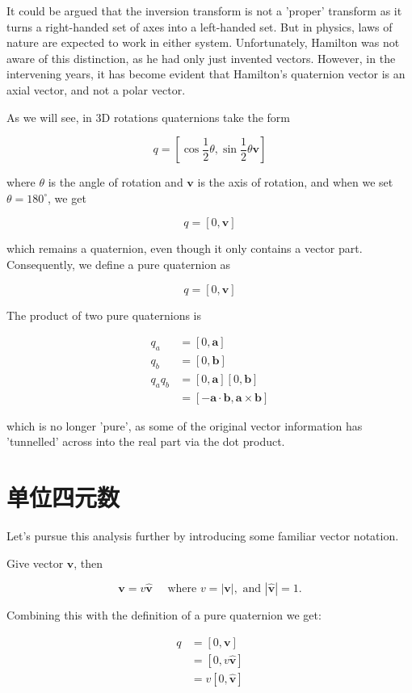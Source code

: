 It could be argued that the inversion transform is not a 'proper' transform as it turns a right-handed set of axes into a left-handed set. But in physics, laws of nature are expected to work in either system. Unfortunately, Hamilton was not aware of this distinction, as he had only just invented vectors. However, in the intervening years, it has become evident that Hamilton's quaternion vector is an axial vector, and not a polar vector.

As we will see, in 3D rotations quaternions take the form

$$
q=\left[\cos \frac{1}{2} \theta, \sin \frac{1}{2} \theta \mathbf{v}\right]
$$

where $\theta$ is the angle of rotation and $\mathbf{v}$ is the axis of rotation, and when we set $\theta=180^{\circ}$, we get

$$
q=[0, \mathbf{v}]
$$

which remains a quaternion, even though it only contains a vector part. Consequently, we define a pure quaternion as

$$
q=[0, \mathbf{v}]
$$

The product of two pure quaternions is

$$
\begin{aligned}
q_{a} & =[0, \mathbf{a}] \\
q_{b} & =[0, \mathbf{b}] \\
q_{a} q_{b} & =[0, \mathbf{a}][0, \mathbf{b}] \\
& =[-\mathbf{a} \cdot \mathbf{b}, \mathbf{a} \times \mathbf{b}]
\end{aligned}
$$

which is no longer 'pure', as some of the original vector information has 'tunnelled' across into the real part via the dot product.

\section{单位四元数}
Let's pursue this analysis further by introducing some familiar vector notation.

Give vector $\mathbf{v}$, then

$$
\mathbf{v}=v \hat{\mathbf{v}} \quad \text { where } v=|\mathbf{v}|, \text { and }|\hat{\mathbf{v}}|=1 .
$$

Combining this with the definition of a pure quaternion we get:

$$
\begin{aligned}
q & =[0, \mathbf{v}] \\
& =[0, v \hat{\mathbf{v}}] \\
& =v[0, \hat{\mathbf{v}}]
\end{aligned}
$$

